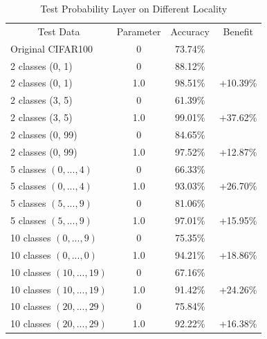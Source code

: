 \documentclass[conference]{IEEEtran}
\begin{document}
\begin{spacing}{0.9}
\begin{table}[!th]
    \centering
    \begin{tabular}{l|c|c|c}
        \hline
        \multicolumn{1}{c|}{Test Data} & Parameter  & Accuracy & Benefit \\
        Original CIFAR100 & 0 & 73.74\% &  \\
        \hline
        2 classes (0, 1) & 0 & 88.12\% &  \\
        2 classes (0, 1) & 1.0 & 98.51\% & +10.39\% \\
        \hline
        2 classes (3, 5) & 0 & 61.39\% &  \\
        2 classes (3, 5) & 1.0 & 99.01\% & +37.62\% \\
        \hline
        2 classes (0, 99) & 0 & 84.65\% & \\
        2 classes (0, 99) & 1.0 & 97.52\% & +12.87\% \\
        \hline
        5 classes $(0, ..., 4)$ & 0 & 66.33\% &  \\
        5 classes $(0, ..., 4)$ & 1.0 & 93.03\% & +26.70\% \\
        \hline
        5 classes $(5, ..., 9)$ & 0 & 81.06\% &  \\
        5 classes $(5, ..., 9)$ & 1.0 & 97.01\% & +15.95\% \\
        \hline
        10 classes $(0, ..., 9)$ & 0 & 75.35\% &  \\
        10 classes $(0, ..., 0)$ & 1.0 & 94.21\% & +18.86\% \\
        \hline
        10 classes $(10, ..., 19)$ & 0 & 67.16\% &  \\
        10 classes $(10, ..., 19)$ & 1.0 & 91.42\% & +24.26\% \\
        \hline
        10 classes $(20, ..., 29)$ & 0 & 75.84\% &  \\
        10 classes $(20, ..., 29)$ & 1.0 & 92.22\% & +16.38\% \\
        \hline
        
        
    \end{tabular}
    \vspace{1em}
    \caption{Test Probability Layer on Different Locality}
    \label{tab:ProbabilityLayer1}
\end{table}



\end{spacing}
\end{document}
